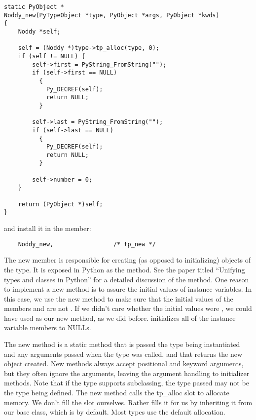 \begin{verbatim}
static PyObject *
Noddy_new(PyTypeObject *type, PyObject *args, PyObject *kwds)
{
    Noddy *self;

    self = (Noddy *)type->tp_alloc(type, 0);
    if (self != NULL) {
        self->first = PyString_FromString("");
        if (self->first == NULL)
          {
            Py_DECREF(self);
            return NULL;
          }
        
        self->last = PyString_FromString("");
        if (self->last == NULL)
          {
            Py_DECREF(self);
            return NULL;
          }

        self->number = 0;
    }

    return (PyObject *)self;
}
\end{verbatim}

and install it in the  member:

\begin{verbatim}
    Noddy_new,                 /* tp_new */
\end{verbatim}

The new member is responsible for creating (as opposed to
initializing) objects of the type.  It is exposed in Python as the
 method.  See the paper titled ``Unifying types and
classes in Python'' for a detailed discussion of the 
method.  One reason to implement a new method is to assure the initial
values of instance variables.  In this case, we use the new method to
make sure that the initial values of the members  and
 are not \NULL. If we didn't care whether the initial
values were \NULL, we could have used  as
our new method, as we did before.  
initializes all of the instance variable members to NULLs.

The new method is a static method that is passed the type being
instantiated and any arguments passed when the type was called,
and that returns the new object created. New methods always accept
positional and keyword arguments, but they often ignore the arguments,
leaving the argument handling to initializer methods. Note that if the
type supports subclassing, the type passed may not be the type being
defined.  The new method calls the tp_alloc slot to allocate memory.
We don't fill the  slot ourselves. Rather
 fills it for us by inheriting it from our
base class, which is  by default.  Most types use the
default allocation.


